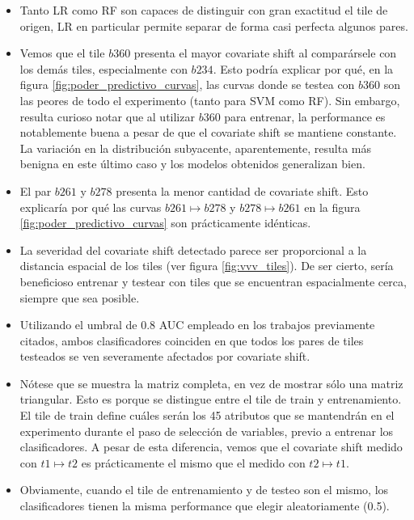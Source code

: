 \begin{itemize}
\item Tanto LR como RF son capaces de distinguir con gran exactitud el tile de origen, LR en particular permite separar de forma casi perfecta algunos pares.
\item Vemos que el tile $b360$ presenta el mayor covariate shift al comparársele con los demás tiles, especialmente con $b234$. Esto podría explicar por qué, en la figura \ref{fig:poder_predictivo_curvas}, las curvas donde se testea con $b360$ son las peores de todo el experimento (tanto para SVM como RF). Sin embargo, resulta curioso notar que al utilizar $b360$ para entrenar, la performance es notablemente buena a pesar de que el covariate shift se mantiene constante. La variación en la distribución subyacente, aparentemente, resulta más benigna en este último caso y los modelos obtenidos generalizan bien.
\item El par $b261$ y $b278$ presenta la menor cantidad de covariate shift. Esto explicaría por qué las curvas $b261 \mapsto b278$ y $b278 \mapsto b261$ en la figura \ref{fig:poder_predictivo_curvas} son prácticamente idénticas.
\item La severidad del covariate shift detectado parece ser proporcional a la distancia espacial de los tiles (ver figura \ref{fig:vvv_tiles}). De ser cierto, sería beneficioso entrenar y testear con tiles que se encuentran espacialmente cerca, siempre que sea posible.
\item Utilizando el umbral de 0.8 AUC empleado en los trabajos previamente citados, ambos clasificadores coinciden en que todos los pares de tiles testeados se ven severamente afectados por covariate shift.
\item Nótese que se muestra la matriz completa, en vez de mostrar sólo una matriz triangular. Esto es porque se distingue entre el tile de train y entrenamiento. El tile de train define cuáles serán los 45 atributos que se mantendrán en el experimento durante el paso de selección de variables, previo a entrenar los clasificadores. A pesar de esta diferencia, vemos que el covariate shift medido con $t1 \mapsto t2$ es prácticamente el mismo que el medido con $t2 \mapsto t1$.
\item Obviamente, cuando el tile de entrenamiento y de testeo son el mismo, los clasificadores tienen la misma performance que elegir aleatoriamente (0.5).
\end{itemize}

